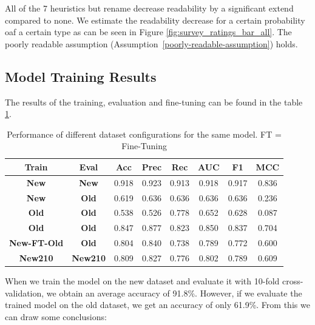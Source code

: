 \documentclass[%
class=scrreprt,
chapterprefix=false,%
open=right,%
twoside=false,%
paper=a4,%
logofile={Logo\_zentral\_farbig\_EN.png},%
thesistype=master,%
UKenglish,%
]{se2thesis}
\theoremstyle{definition}
\newenvironment{researchbox}[1]{\begin{tcolorbox}[colback=blue!10!white,colframe=blue!50!black,title=#1]}{\end{tcolorbox}}
\begin{document}
	\begin{researchbox}{Summary (RQ2 - generate-poor):}
		All of the 7 heuristics but rename decrease readability by a significant extend compared to none. We estimate the readability decrease for a certain probability oaf a certain type as can be seen in Figure \ref{fig:survey_ratings_bar_all}. The poorly readable assumption (Assumption~\ref{poorly-readable-assumption}) holds. 
	\end{researchbox}

\subsection{Model Training Results} \label{Model training results}
	The results of the training, evaluation and fine-tuning can be found in the table \ref{tab:dataset_performance}.
	
	\begin{table}[h]
		\centering
		\begin{tabular}{|c|c|c|c|c|c|c|c|}
			\hline
			\textbf{Train} & \textbf{Eval} & \textbf{Acc} & \textbf{Prec} & \textbf{Rec} & \textbf{AUC} & \textbf{F1} & \textbf{MCC} \\
			\hline
			\textbf{New} 		& \textbf{New} 	& 0.918 & 0.923 & 0.913 & 0.918 & 0.917 & 0.836 \\
			\textbf{New} 		& \textbf{Old}  	& 0.619 & 0.636 & 0.636 & 0.636 & 0.636 & 0.236 \\
			\textbf{Old} 		& \textbf{Old} 	& 0.538 & 0.526 & 0.778 & 0.652 & 0.628 & 0.087 \\
			\textbf{Old}  		& \textbf{Old}  	& 0.847 & 0.877 & 0.823 & 0.850 & 0.837 & 0.704 \\
			
			\textbf{New-FT-Old}& \textbf{Old}  	& 0.804 & 0.840 & 0.738 & 0.789 & 0.772 & 0.600 \\
			\textbf{New210}  	& \textbf{New210}  & 0.809 & 0.827 & 0.776 & 0.802 & 0.789 & 0.609 \\
			\hline
		\end{tabular}
		\caption{Performance of different dataset configurations for the same model. FT = Fine-Tuning}
		\label{tab:dataset_performance}
	\end{table}
		
	When we train the model on the new dataset and evaluate it with 10-fold cross-validation, we obtain an average accuracy of 91.8\%. However, if we evaluate the trained model on the old dataset, we get an accuracy of only 61.9\%. From this we can draw some conclusions:
	
\end{document}
